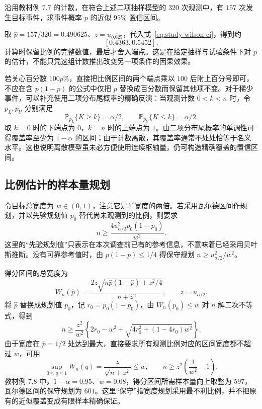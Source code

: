 \begin{example}
\label{ex:study-phishing-proportion}
沿用教材例 7.7 的计数，在符合上述二项抽样模型的 $320$ 次观测中，有 $157$ 次发生目标事件，求事件概率 $p$ 的近似 $95\%$ 置信区间。
\end{example}
\begin{solve}
取 $\widehat p=157/320=0.490625$、$z=u_{0.025}$，代入式~\eqref{eq:study-wilson-ci}，得到约
\[
  [0.4363,0.5452].
\]
计算时保留比例的完整数值，最后才舍入端点。这是在给定抽样与试验条件下对 $p$ 的估计，不能只凭这组计数推出改变另一项条件的因果效果。
\end{solve}

若关心百分数 $100p\%$，直接把比例区间的两个端点乘以 $100$ 后附上百分号即可，不应在含 $p(1-p)$ 的公式中仅把 $p$ 替换成百分数而保留其他项不变。对于稀少事件，可以补充使用二项分布尾概率的精确反演：当观测计数 $0<k<n$ 时，令 $p_L,p_U$ 分别满足
\begin{equation}
  \mathbb P_{p_L}\{K\ge k\}=\alpha/2,\qquad
  \mathbb P_{p_U}\{K\le k\}=\alpha/2.
  \label{eq:study-binomial-exact-inversion}
\end{equation}
取 $k=0$ 时的下端点为 $0$，$k=n$ 时的上端点为 $1$。由二项分布尾概率的单调性可得覆盖率至少为 $1-\alpha$ 的区间；由于计数离散，其覆盖率通常不处处恰等于名义水平。这也说明离散模型虽未必方便使用连续枢轴量，仍可构造精确覆盖的置信区间。

\subsection{比例估计的样本量规划}
\label{subsec:study-proportion-sample-size}

令目标总宽度为 $w\in(0,1)$，注意它是半宽度的两倍。若采用瓦尔德区间作规划，并以先验规划值 $p_0$ 替代尚未观测到的比例，则要求
\begin{equation}
  n\ge\frac{4u_{\alpha/2}^2p_0(1-p_0)}{w^2}.
  \label{eq:study-proportion-wald-size}
\end{equation}
这里的“先验规划值”只表示在本次调查前已有的参考信息，不意味着已经采用贝叶斯推断。没有可靠参考值时，由 $p(1-p)\le1/4$ 得保守规划 $n\ge u_{\alpha/2}^2/w^2$。

得分区间的总宽度为
\[
  W_n(\widehat p)
  =\frac{2z\sqrt{n\widehat p(1-\widehat p)+z^2/4}}{n+z^2},
  \qquad z=u_{\alpha/2}.
\]
将 $\widehat p$ 替换成规划值 $p_0$，记 $r_0=p_0(1-p_0)$，由 $W_n(p_0)\le w$ 对 $n$ 解二次不等式，得到
\begin{equation}
  n\ge\frac{z^2}{w^2}
       \left\{2r_0-w^2+
        \sqrt{4r_0^2+(1-4r_0)w^2}\right\}.
  \label{eq:study-proportion-wilson-size}
\end{equation}
由于宽度在 $\widehat p=1/2$ 处达到最大，直接要求所有观测比例对应的区间宽度都不超过 $w$，可用
\begin{equation}
  \sup_{0\le q\le1}W_n(q)=\frac z{\sqrt{n+z^2}}\le w,
  \qquad n\ge z^2\left(\frac1{w^2}-1\right).
  \label{eq:study-proportion-wilson-conservative-size}
\end{equation}
教材例 7.8 中，$1-\alpha=0.95$、$w=0.08$，得分区间所需样本量向上取整为 $597$，瓦尔德区间的保守规划为 $601$。这里“保守”指宽度规划采用最不利比例，并不把原有的近似覆盖变成有限样本精确保证。

